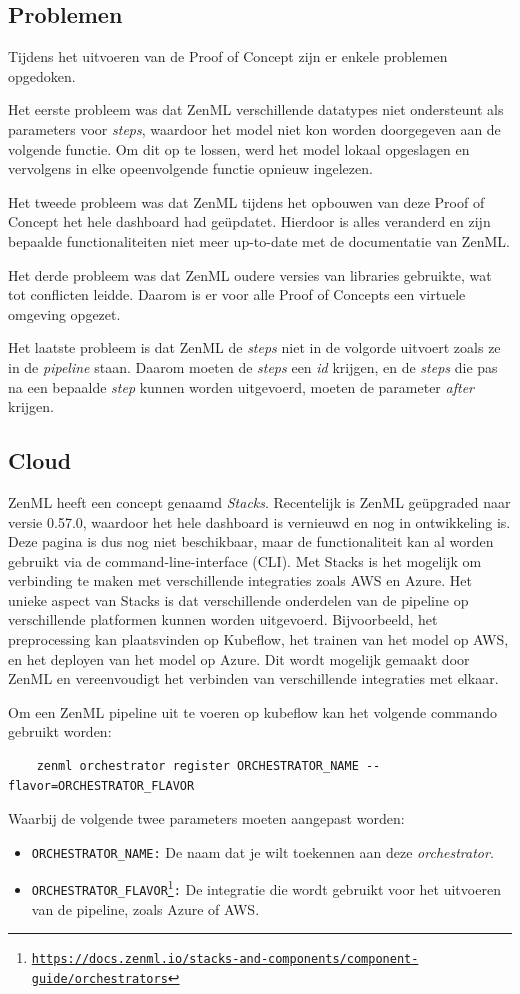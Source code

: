 \subsection{Problemen}
Tijdens het uitvoeren van de Proof of Concept zijn er enkele problemen opgedoken.

Het eerste probleem was dat ZenML verschillende datatypes niet ondersteunt als parameters voor \textit{steps}, waardoor het model niet kon worden doorgegeven aan de volgende functie. Om dit op te lossen, werd het model lokaal opgeslagen en vervolgens in elke opeenvolgende functie opnieuw ingelezen.

Het tweede probleem was dat ZenML tijdens het opbouwen van deze Proof of Concept het hele dashboard had geüpdatet. Hierdoor is alles veranderd en zijn bepaalde functionaliteiten niet meer up-to-date met de documentatie van ZenML.

Het derde probleem was dat ZenML oudere versies van libraries gebruikte, wat tot conflicten leidde. Daarom is er voor alle Proof of Concepts een virtuele omgeving opgezet.

Het laatste probleem is dat ZenML de \textit{steps} niet in de volgorde uitvoert zoals ze in de \textit{pipeline} staan. Daarom moeten de \textit{steps} een \textit{id} krijgen, en de \textit{steps} die pas na een bepaalde \textit{step} kunnen worden uitgevoerd, moeten de parameter \textit{after} krijgen.
\subsection{Cloud}
ZenML heeft een concept genaamd \textit{Stacks}. Recentelijk is ZenML geüpgraded naar versie 0.57.0, waardoor het hele dashboard is vernieuwd en nog in ontwikkeling is. Deze pagina is dus nog niet beschikbaar, maar de functionaliteit kan al worden gebruikt via de command-line-interface (CLI).
Met Stacks is het mogelijk om verbinding te maken met verschillende integraties zoals AWS en Azure. Het unieke aspect van Stacks is dat verschillende onderdelen van de pipeline op verschillende platformen kunnen worden uitgevoerd. Bijvoorbeeld, het preprocessing kan plaatsvinden op Kubeflow, het trainen van het model op AWS, en het deployen van het model op Azure. Dit wordt mogelijk gemaakt door ZenML en vereenvoudigt het verbinden van verschillende integraties met elkaar.

Om een ZenML pipeline uit te voeren op kubeflow kan het volgende commando gebruikt worden:
\begin{verbatim}
    zenml orchestrator register ORCHESTRATOR_NAME --flavor=ORCHESTRATOR_FLAVOR
\end{verbatim}
Waarbij de volgende twee parameters moeten aangepast worden:
\begin{itemize}
    \item \texttt{ORCHESTRATOR\_NAME:} De naam dat je wilt toekennen aan deze \textit{orchestrator}.
    \item \texttt{ORCHESTRATOR\_FLAVOR\footnote{\url{https://docs.zenml.io/stacks-and-components/component-guide/orchestrators}}:} De integratie die wordt gebruikt voor het uitvoeren van de pipeline, zoals Azure of AWS.
\end{itemize}

